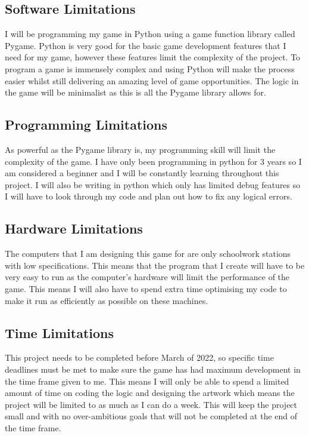 \documentclass[12pt]{report}
\begin{document}
\subsection{Software Limitations}
I will be programming my game in Python using a game function library called Pygame. Python is very good for the basic game development features that I need for my game, however these features limit the complexity of the project. To program a game is immensely complex and using Python will make the process easier whilst still delivering an amazing level of game opportunities. The logic in the game will be minimalist as this is all the Pygame library allows for. 

\subsection{Programming Limitations}
As powerful as the Pygame library is, my programming skill will limit the complexity of the game. I have only been programming in python for 3 years so I am considered a beginner and I will be constantly learning throughout this project. I will also be writing in python which only has limited debug features so I will have to look through my code and plan out how to fix any logical errors.

\subsection{Hardware Limitations}
The computers that I am designing this game for are only schoolwork stations with low specifications. This means that the program that I create will have to be very easy to run as the computer’s hardware will limit the performance of the game. This means I will also have to spend extra time optimising my code to make it run as efficiently as possible on these machines. 

\subsection{Time Limitations}
This project needs to be completed before March of 2022, so specific time deadlines must be met to make sure the game has had maximum development in the time frame given to me. This means I will only be able to spend a limited amount of time on coding the logic and designing the artwork which means the project will be limited to as much as I can do a week. This will keep the project small and with no over-ambitious goals that will not be completed at the end of the time frame. 
\end{document}
